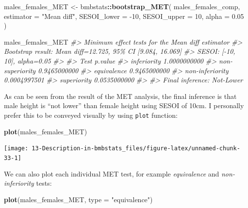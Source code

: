 \documentclass[
]{book}
\newenvironment{Shaded}{\begin{snugshade}}{\end{snugshade}}
\newcommand{\CommentTok}[1]{\textcolor[rgb]{0.56,0.35,0.01}{\textit{#1}}}
\newcommand{\DataTypeTok}[1]{\textcolor[rgb]{0.13,0.29,0.53}{#1}}
\newcommand{\DecValTok}[1]{\textcolor[rgb]{0.00,0.00,0.81}{#1}}
\newcommand{\FloatTok}[1]{\textcolor[rgb]{0.00,0.00,0.81}{#1}}
\newcommand{\KeywordTok}[1]{\textcolor[rgb]{0.13,0.29,0.53}{\textbf{#1}}}
\newcommand{\NormalTok}[1]{#1}
\newcommand{\OperatorTok}[1]{\textcolor[rgb]{0.81,0.36,0.00}{\textbf{#1}}}
\newcommand{\StringTok}[1]{\textcolor[rgb]{0.31,0.60,0.02}{#1}}
\begin{document}
\begin{Shaded}
\begin{Highlighting}[]
\NormalTok{males\_females\_MET <{-}}\StringTok{ }\NormalTok{bmbstats}\OperatorTok{::}\KeywordTok{bootstrap\_MET}\NormalTok{(}
\NormalTok{  males\_females\_comp,}
  \DataTypeTok{estimator =} \StringTok{"Mean diff"}\NormalTok{,}
  \DataTypeTok{SESOI\_lower =} \DecValTok{{-}10}\NormalTok{,}
  \DataTypeTok{SESOI\_upper =} \DecValTok{10}\NormalTok{,}
  \DataTypeTok{alpha =} \FloatTok{0.05}
\NormalTok{)}

\NormalTok{males\_females\_MET}
\CommentTok{\#> Minimum effect tests for the \textasciigrave{}Mean diff\textasciigrave{} estimator}
\CommentTok{\#> Bootstrap result: Mean diff=12.725, 95\% CI [9.084, 16.069]}
\CommentTok{\#> SESOI: [{-}10, 10], alpha=0.05}
\CommentTok{\#> }
\CommentTok{\#>             Test      p.value}
\CommentTok{\#>      inferiority 1.0000000000}
\CommentTok{\#>  non{-}superiority 0.9465000000}
\CommentTok{\#>      equivalence 0.9465000000}
\CommentTok{\#>  non{-}inferiority 0.0004997501}
\CommentTok{\#>      superiority 0.0535000000}
\CommentTok{\#> }
\CommentTok{\#> Final inference: Not{-}Lower}
\end{Highlighting}
\end{Shaded}

As can be seen from the result of the MET analysis, the final inference is that male height is ``not lower'' than female height using SESOI of 10cm. I personally prefer this to be conveyed visually by using \texttt{plot} function:

\begin{Shaded}
\begin{Highlighting}[]
\KeywordTok{plot}\NormalTok{(males\_females\_MET)}
\end{Highlighting}
\end{Shaded}

\begin{center}\texttt{[image: 13-Description-in-bmbstats\_files/figure-latex/unnamed-chunk-33-1]} \end{center}

We can also plot each individual MET test, for example \emph{equivalence} and \emph{non-inferiority} tests:

\begin{Shaded}
\begin{Highlighting}[]
\KeywordTok{plot}\NormalTok{(males\_females\_MET, }\DataTypeTok{type =} \StringTok{"equivalence"}\NormalTok{)}
\end{Highlighting}
\end{Shaded}
\end{document}
